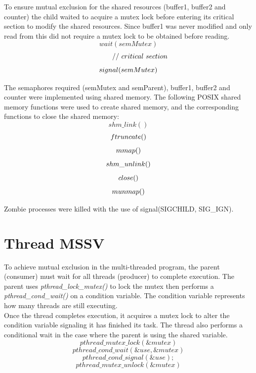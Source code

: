 \documentclass[]{article}
\begin{document}
To ensure mutual exclusion for the shared resources (buffer1, buffer2 and counter) the child waited to acquire a mutex lock before entering its critical section to modify the shared resources. Since buffer1 was never modified and only read from this did not require a mutex lock to be obtained before reading. \\
$$
wait(semMutex)
$$
$$
\ \ \ \ \ \ \ \ \ \ //\ critical\ section\\ 
$$
$$
signal(semMutex)\\ \\
$$
\vspace{0.1cm}

The semaphores required (semMutex and semParent), buffer1, buffer2 and counter were implemented using shared memory. The following POSIX shared memory functions were used to create shared memory, and the corresponding functions to close the shared memory: \\
$$
shm\_link()
$$
$$
ftruncate()\\
$$
$$
mmap()\\ 
$$
$$
shm\_unlink() \\
$$
$$
close()\\
$$
$$
munmap()\\ 
$$
	
\vspace{0.2cm}
	
Zombie processes were killed with the use of signal(SIGCHILD, SIG\_IGN).


\section{Thread MSSV}
To achieve mutual exclusion in the multi-threaded program, the parent (consumer) must wait for all threads (producer) to complete execution. The parent uses \textit{pthread\_lock\_mutex()} to lock the mutex then performs a \textit{pthread\_cond\_wait()} on a condition variable. The condition variable represents how many threads are still executing. \\

Once the thread completes execution, it acquires a mutex lock to alter the condition variable signaling it has finished its task. The thread also performs a conditional wait in the case where the parent is using the shared variable. \\
$$
pthread\_mutex\_lock(\&mutex )
$$
$$
pthread\_cond\_wait(\&use, \&mutex)
$$
$$
pthread\_cond\_signal(\&use);
$$
$$
pthread\_mutex\_unlock(\&mutex)
$$
\vspace{0.2cm}
\end{document}
